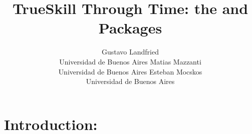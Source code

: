 \documentclass[article]{jss}
\author{Gustavo Landfried \\Universidad de Buenos Aires
   \And Matias Mazzanti \\Universidad de Buenos Aires
   \And Esteban Mocskos \\Universidad de Buenos Aires}
\title{TrueSkill Through Time: the \proglang{Python} and \proglang{R} Packages}
\newif\ifen
\newif\ifes
\newcommand{\en}[1]{\ifen#1\fi}
\newcommand{\es}[1]{\ifes#1\fi}
\begin{document}
\lstset{language=Python}

\section[Introduction]{Introduction: } \label{sec:intro}



\en{Human adaptation depends on a special integration of biological, cognitive and social processes~\citep{Koster2020}.}
\es{La adaptación humana depende de una integración especial de los procesos biológicos, cognitivos y sociales~\citep{Koster2020}.}
%
\en{Our brains develop first followed by the body because this sequence allows a longer period of learning~\citep{GonzalezForero2018}.}
\es{Nuetros cerebros se desarrollan primero, seguidos por el cuerpo porque esta secuencia permite un período más largo de aprendizaje~\citep{GonzalezForero2018}.}
%
\en{Among hominoids, human life histories are distinguished by long periods of juvenile dependency, short intervals between births, and a long post-reproductive life span~\citep{Jones2011}.}
\es{Entre los hominoides, las historias de vida humanas se distinguen por largos períodos de dependencia juvenil, cortos intervalos entre nacimientos y una larga vida posreproductiva~\citep{Jones2011}.}
%
%
\en{A special cognitive ability to acquire cultural information makes human adaptation a population-based process~\citep{Herrmann2007}.}
\es{Una capacidad cognitiva especial para adquirir información cultural hace que la adaptación humana sea un proceso poblacional~\citep{Herrmann2007}.}
%
\en{Humans learn things from others, modify and transmit them to the next generation.}
\es{Los humanos aprendemos cosas de los demás, las modificamos y  transmitimos a la siguiente generación.}
%
\en{Therefore, cultural evolution is also affected by demographic characteristics, such as the size and structure of populations.~\cite{derex2020-populationStructure}.}
\es{Por lo tanto, la evolución cultural también se ve afectada por las características demográficas, como el tamaño y estructura de las poblaciones~\cite{derex2020-populationStructure}.} 
\end{document}
